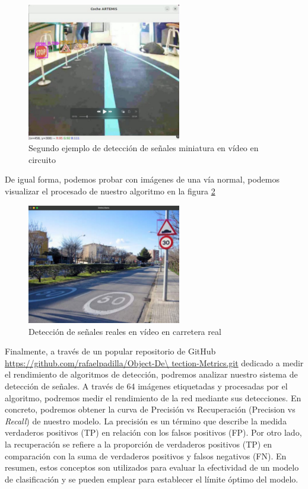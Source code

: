 \begin{figure}[H]
    \centering
 	\includegraphics[width=0.6\textwidth]{Imagenes/IA/deteccion2.pdf}
    \caption{Segundo ejemplo de detección de señales miniatura en vídeo en circuito}
    \label{deteccion2}
\end{figure}

De igual forma, podemos probar con imágenes de una vía normal, podemos visualizar el procesado de nuestro algoritmo en la figura \ref{deteccion3}\\

\begin{figure}[H]
    \centering
 	\includegraphics[width=0.6\textwidth]{Imagenes/IA/deteccion3.pdf}
    \caption{Detección de señales reales en vídeo en carretera real}
    \label{deteccion3}
\end{figure}

Finalmente, a través de un popular repositorio de GitHub \url{https://github.com/rafaelpadilla/Object-De\ tection-Metrics.git} dedicado a medir el rendimiento de algoritmos de detección, podremos analizar nuestro sistema de detección de señales. A través de 64 imágenes etiquetadas y procesadas por el algoritmo, podremos medir el rendimiento de la red mediante sus detecciones. En concreto, podremos obtener la curva de Precisión vs Recuperación (Precision vs \textit{Recall}) de nuestro modelo. La precisión es un término que describe la medida verdaderos positivos (TP) en relación con los falsos positivos (FP). Por otro lado, la recuperación se refiere a la proporción de verdaderos positivos (TP) en comparación con la suma de verdaderos positivos y falsos negativos (FN). En resumen, estos conceptos son utilizados para evaluar la efectividad de un modelo de clasificación y se pueden emplear para establecer el límite óptimo del modelo.\\

